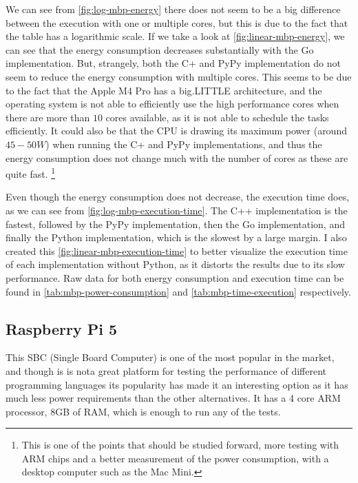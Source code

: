 


We can see from \autoref{fig:log-mbp-energy} there does not seem to be a big difference between the execution with one or multiple cores, but this is due to the fact that the table has a logarithmic scale. If we take a look at \autoref{fig:linear-mbp-energy}, we can see that the energy consumption decreases substantially with the Go implementation. But, strangely, both the C\++ and PyPy implementation do not seem to reduce the energy consumption with multiple cores. This seems to be due to the fact that the Apple M4 Pro has a big.LITTLE architecture, and the operating system is not able to efficiently use the high performance cores when there are more than $10$ cores available, as it is not able to schedule the tasks efficiently. It could also be that the CPU is drawing its maximum power (around $45-50W$) when running the C\++ and PyPy implementations, and thus the energy consumption does not change much with the number of cores as these are quite fast. \footnote{This is one of the points that should be studied forward, more testing with ARM chips and a better measurement of the power consumption, with a desktop computer such as the Mac Mini.}



Even though the energy consumption does not decrease, the execution time does, as we can see from \autoref{fig:log-mbp-execution-time}. The C++ implementation is the fastest, followed by the PyPy implementation, then the Go implementation, and finally the Python implementation, which is the slowest by a large margin. I also created this \autoref{fig:linear-mbp-execution-time} to better visualize the execution time of each implementation without Python, as it distorts the results due to its slow performance. Raw data for both energy consumption and execution time can be found in \autoref{tab:mbp-power-consumption} and \autoref{tab:mbp-time-execution} respectively.


\subsection{Raspberry Pi 5}
This SBC (Single Board Computer) is one of the most popular in the market, and though is is nota great platform for testing the performance of different programming languages its popularity has made it an interesting option as it has much less power requirements than the other alternatives. It has a 4 core ARM processor, 8GB of RAM, which is enough to run any of the tests. 


